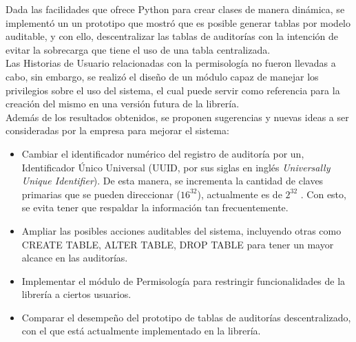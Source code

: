 Dada las facilidades que ofrece Python para crear clases de manera dinámica, se implementó un un prototipo que mostró que es posible generar tablas por modelo auditable, y con ello, descentralizar las tablas de auditorías con la intención de evitar la sobrecarga que tiene el uso de una tabla centralizada.\\

Las Historias de Usuario relacionadas con la permisología no fueron llevadas a cabo, sin embargo, se realizó el diseño de un módulo capaz de manejar los privilegios sobre el uso del sistema, el cual puede servir como referencia para la creación del mismo en una versión futura de la librería.\\

Además de los resultados obtenidos, se proponen sugerencias y nuevas ideas a ser consideradas por la empresa para mejorar el sistema:

\begin{itemize}
    \item Cambiar el identificador numérico del registro de auditoría por un, Identificador Único Universal (UUID, por sus siglas en inglés \textit{Universally Unique Identifier}). De esta manera, se incrementa la cantidad de claves primarias que se pueden direccionar ($16^32$), actualmente es de $2^32$ . Con esto, se evita tener que respaldar la información tan frecuentemente.
    \item Ampliar las posibles acciones auditables del sistema, incluyendo otras como CREATE TABLE, ALTER TABLE, DROP TABLE para tener un mayor alcance en las auditorías.
    \item Implementar el módulo de Permisología para restringir funcionalidades de la librería a ciertos usuarios.
    \item Comparar el desempeño del prototipo de tablas de auditorías descentralizado, con el que está actualmente implementado en la librería.
\end{itemize}
